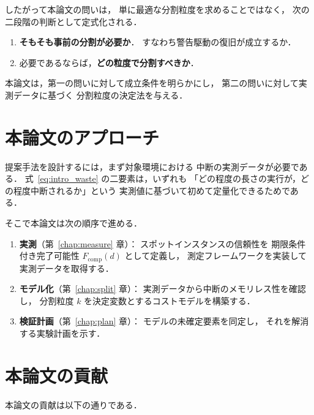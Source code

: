 \documentclass[11pt,a4paper]{ltjsreport}
\newcommand{\Fcomp}{F_{\mathrm{comp}}}
\begin{document}
したがって本論文の問いは，
単に最適な分割粒度を求めることではなく，
次の二段階の判断として定式化される．

\begin{enumerate}
  \item \textbf{そもそも事前の分割が必要か}．
        すなわち警告駆動の復旧が成立するか．
  \item 必要であるならば，\textbf{どの粒度で分割すべきか}．
\end{enumerate}

本論文は，第一の問いに対して成立条件を明らかにし，
第二の問いに対して実測データに基づく
分割粒度の決定法を与える．

\section{本論文のアプローチ}

提案手法を設計するには，まず対象環境における
中断の実測データが必要である．
式~\eqref{eq:intro_waste} の二要素は，いずれも
「どの程度の長さの実行が，どの程度中断されるか」という
実測値に基づいて初めて定量化できるためである．

そこで本論文は次の順序で進める．

\begin{enumerate}
  \item \textbf{実測}（第~\ref{chap:measure} 章）：
        スポットインスタンスの信頼性を
        期限条件付き完了可能性 $\Fcomp(d)$ として定義し，
        測定フレームワークを実装して実測データを取得する．
  \item \textbf{モデル化}（第~\ref{chap:split} 章）：
        実測データから中断のメモリレス性を確認し，
        分割粒度 $k$ を決定変数とするコストモデルを構築する．
  \item \textbf{検証計画}（第~\ref{chap:plan} 章）：
        モデルの未確定要素を同定し，
        それを解消する実験計画を示す．
\end{enumerate}

\section{本論文の貢献}

本論文の貢献は以下の通りである．
\end{document}

